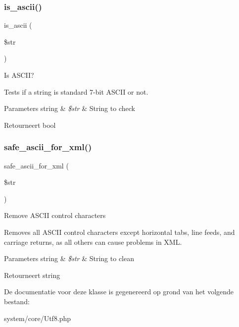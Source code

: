 \subsubsection{\texorpdfstring{is\_ascii()}{is\_ascii()}}
{\footnotesize\ttfamily is\+\_\+ascii (\begin{DoxyParamCaption}\item[{}]{\$str }\end{DoxyParamCaption})}

Is A\+S\+C\+II?

Tests if a string is standard 7-\/bit A\+S\+C\+II or not.


\begin{DoxyParams}[1]{Parameters}
string & {\em \$str} & String to check \\
\hline
\end{DoxyParams}
\begin{DoxyReturn}{Retourneert}
bool 
\end{DoxyReturn}
\mbox{\label{class_c_i___utf8_a10d712b507a87fd841f134143eaedb8e}} 
\subsubsection{\texorpdfstring{safe\_ascii\_for\_xml()}{safe\_ascii\_for\_xml()}}
{\footnotesize\ttfamily safe\+\_\+ascii\+\_\+for\+\_\+xml (\begin{DoxyParamCaption}\item[{}]{\$str }\end{DoxyParamCaption})}

Remove A\+S\+C\+II control characters

Removes all A\+S\+C\+II control characters except horizontal tabs, line feeds, and carriage returns, as all others can cause problems in X\+ML.


\begin{DoxyParams}[1]{Parameters}
string & {\em \$str} & String to clean \\
\hline
\end{DoxyParams}
\begin{DoxyReturn}{Retourneert}
string 
\end{DoxyReturn}


De documentatie voor deze klasse is gegenereerd op grond van het volgende bestand\+:\begin{DoxyCompactItemize}
\item 
system/core/Utf8.\+php\end{DoxyCompactItemize}
